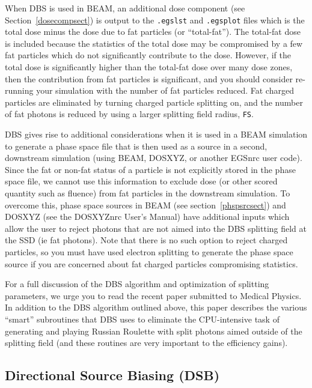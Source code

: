 \documentclass[12pt,twoside]{article}
\begin{document}
When DBS is used in BEAM, an additional dose component (see
Section~\ref{dosecompsect}) is output to the {\tt .egslst} and
{\tt .egsplot} files which is the total dose minus the dose due to
fat particles (or ``total-fat'').  The total-fat dose is included because
the statistics of the total dose may be compromised by a few fat particles
which do not significantly contribute to the dose.  However, if
the total dose is significantly higher than the total-fat dose over
many dose zones, then the contribution from fat particles is
significant, and you should consider re-running your simulation with
the number of fat particles reduced.  Fat charged particles are eliminated
by turning charged particle splitting on, and the
number of fat photons is reduced by
using a larger splitting field radius, {\tt FS}.

DBS gives rise to additional considerations when it is used in a BEAM
simulation to generate a phase space file that is then used as a source
in a
second, downstream simulation (using BEAM, DOSXYZ, or another EGSnrc
user code).  Since the fat or non-fat status of a particle
is not explicitly stored in the phase space file, we cannot use this information to
exclude dose (or other scored quantity such as fluence)
from fat particles in the downstream simulation.  To overcome this,
phase space sources in BEAM (see section~\ref{phspsrcsect}) and
DOSXYZ (see the DOSXYZnrc User's Manual\cite{Wa05}) have additional inputs
which allow the user to reject photons that are not aimed into the
DBS splitting field at the SSD (ie fat photons).  Note that there
is no such option to reject charged particles, so you must have used
electron splitting to generate the phase space source if you are concerned
about fat charged particles compromising statistics.



For a full discussion of the DBS algorithm and optimization of
splitting parameters, we urge you to read
the recent paper submitted to Medical Physics\cite{Ka04a}.  In addition
to the DBS algorithm outlined above, this paper describes
the various ``smart'' subroutines that DBS uses to eliminate the CPU-intensive
task of generating and playing Russian Roulette with
split photons aimed outside of the splitting field (and these routines are
very important to the efficiency gains).

\subsection[Directional Source Biasing]{Directional Source Biasing (DSB)}
\label{DSB}
\end{document}
